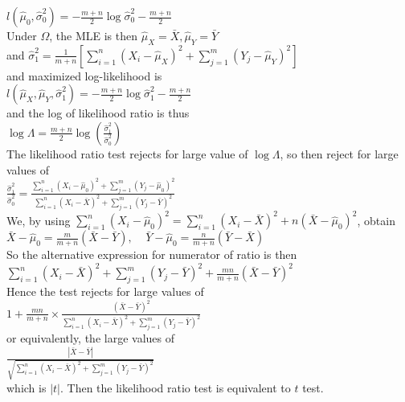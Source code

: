 \documentclass[12pt]{article}
\theoremstyle{definition}
\begin{document}
$
l(\hat{\mu}_0, \hat{\sigma}_0^2)=-\frac{m+n}{2}\log \hat{\sigma}_0^2-\frac{m+n}{2}
$\\
Under $\Omega$, the MLE is then
$
\hat{\mu}_X=\bar{X}, \hat{\mu}_Y=\bar{Y}
$\\
and 
$
\hat{\sigma}_1^2 = \frac{1}{m+n}[\sum_{i=1}^n (X_i-\hat{\mu}_X)^2+\sum_{j=1}^m (Y_j-\hat{\mu}_Y)^2]
$\\
and maximized log-likelihood is\\
$
l(\hat{\mu}_X, \hat{\mu}_Y, \hat{\sigma}_1^2)=-\frac{m+n}{2}\log \hat{\sigma}_1^2-\frac{m+n}{2}
$\\
and the log of likelihood ratio is thus\\
$
\log \Lambda = \frac{m+n}{2}\log (\frac{\hat{\sigma}_1^2}{\hat{\sigma}_0^2})
$\\
The likelihood ratio test rejects for large value of $\log \Lambda$, so then reject for large values of \\
$
\frac{\hat{\sigma}_1^2}{\hat{\sigma}_0^2} = \frac{\sum_{i=1}^n (X_i-\hat{\mu}_0)^2+\sum_{j=1}^m(Y_j-\hat{\mu}_0)^2}{\sum_{i=1}^n (X_i-\bar{X})^2+\sum_{j=1}^m(Y_j-\bar{Y})^2}
$\\
We, by using $\sum_{i=1}^n (X_i-\hat{\mu}_0)^2 = \sum_{i=1}^n (X_i-\bar{X})^2+n(\bar{X}-\hat{\mu}_0)^2$, obtain\\
$
\bar{X}-\hat{\mu}_0=\frac{m}{m+n}(\bar{X}-\bar{Y}), \;\;\;\;\bar{Y}-\hat{\mu}_0=\frac{n}{m+n}(\bar{Y}-\bar{X})
$\\
So the alternative expression for numerator of ratio is then\\
$
\sum_{i=1}^n(X_i-\bar{X})^2+\sum_{j=1}^m (Y_j-\bar{Y})^2+\frac{mn}{m+n}(\bar{X}-\bar{Y})^2
$\\
Hence the test rejects for large values of\\
$
1+\frac{mn}{m+n}\times \frac{(\bar{X}-\bar{Y})^2}{\sum_{i=1}^n(X_i-\bar{X})^2+\sum_{j=1}^m (Y_j-\bar{Y})^2}
$\\
or equivalently, the large values of \\
$
\frac{|\bar{X}-\bar{Y}|}{\sqrt{\sum_{i=1}^n(X_i-\bar{X})^2+\sum_{j=1}^m (Y_j-\bar{Y})^2}}
$\\
which is $|t|$. Then the likelihood ratio test is equivalent to $t$ test.
\end{document}
